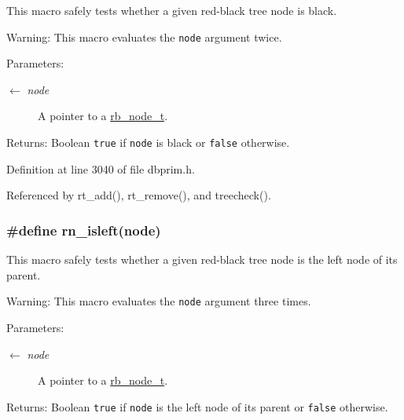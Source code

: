 This macro safely tests whether a given red-black tree node is black.

\begin{Desc}
\item[Warning:]This macro evaluates the {\tt node} argument twice.\end{Desc}
\begin{Desc}
\item[Parameters:]
\begin{description}
\item[\mbox{$\leftarrow$} {\em node}]A pointer to a \hyperlink{group__dbprim__rbtree_ga1}{rb\_\-node\_\-t}.\end{description}
\end{Desc}
\begin{Desc}
\item[Returns:]Boolean {\tt true} if {\tt node} is black or {\tt false} otherwise.\end{Desc}


Definition at line 3040 of file dbprim.h.

Referenced by rt\_\-add(), rt\_\-remove(), and treecheck().\hypertarget{group__dbprim__rbtree_ga41}{
\subsubsection[rn\_\-isleft]{\setlength{\rightskip}{0pt plus 5cm}\#define rn\_\-isleft(node)}}
\label{group__dbprim__rbtree_ga41}


This macro safely tests whether a given red-black tree node is the left node of its parent.

\begin{Desc}
\item[Warning:]This macro evaluates the {\tt node} argument three times.\end{Desc}
\begin{Desc}
\item[Parameters:]
\begin{description}
\item[\mbox{$\leftarrow$} {\em node}]A pointer to a \hyperlink{group__dbprim__rbtree_ga1}{rb\_\-node\_\-t}.\end{description}
\end{Desc}
\begin{Desc}
\item[Returns:]Boolean {\tt true} if {\tt node} is the left node of its parent or {\tt false} otherwise.\end{Desc}


